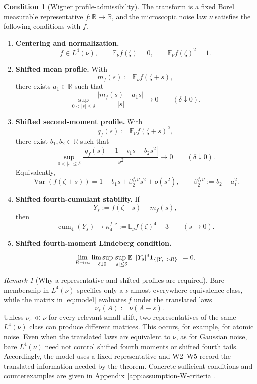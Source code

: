 \documentclass[11pt]{article}
\theoremstyle{definition}
\newtheorem{condition}[theorem]{Condition}
\theoremstyle{remark}
\newtheorem{remark}[theorem]{Remark}
\newcommand{\E}{\mathbb E}
\newcommand{\Var}{\operatorname{Var}}
\newcommand{\cum}{\operatorname{cum}}
\begin{document}
\begin{condition}[Wigner profile-admissibility]\label{cond:profile-admissibility}
The transform is a fixed Borel measurable representative
$f:\mathbb R\to\mathbb R$, and the microscopic noise law $\nu$ satisfies the
following conditions with $f$.
\begin{enumerate}[label=(W\arabic*)]
\item \textbf{Centering and normalization.}
\[
        f\in L^4(\nu),\qquad
        \E_\nu f(\zeta)=0,\qquad
        \E_\nu f(\zeta)^2=1 .
\]
\item \textbf{Shifted mean profile.} With
\[
        m_f(s):=\E_\nu f(\zeta+s),
\]
there exists $a_1\in\mathbb R$ such that
\[
        \sup_{0<|s|\le\delta}
        \frac{|m_f(s)-a_1s|}{|s|}\longrightarrow0
        \qquad(\delta\downarrow0).
\]
\item \textbf{Shifted second-moment profile.} With
\[
        q_f(s):=\E_\nu f(\zeta+s)^2,
\]
there exist $b_1,b_2\in\mathbb R$ such that
\[
        \sup_{0<|s|\le\delta}
        \frac{|q_f(s)-1-b_1s-b_2s^2|}{s^2}\longrightarrow0
        \qquad(\delta\downarrow0).
\]
Equivalently,
\[
        \Var(f(\zeta+s))
        =1+b_1s+\beta_2^{f,\nu}s^2+o(s^2),\qquad
        \beta_2^{f,\nu}:=b_2-a_1^2.
\]
\item \textbf{Shifted fourth-cumulant stability.} If
\[
        Y_s:=f(\zeta+s)-m_f(s),
\]
then
\[
        \cum_4(Y_s)\longrightarrow
        \kappa_4^{f,\nu}:=\E_\nu f(\zeta)^4-3
        \qquad(s\to0).
\]
\item \textbf{Shifted fourth-moment Lindeberg condition.}
\[
        \lim_{R\to\infty}\limsup_{\delta\downarrow0}
        \sup_{|s|\le\delta}
        \E\Bigl[|Y_s|^4{\bf 1}_{\{|Y_s|>R\}}\Bigr]=0.
\]
\end{enumerate}
\end{condition}

\begin{remark}[Why a representative and shifted profiles are required]
Bare membership in $L^4(\nu)$ specifies only a $\nu$-almost-everywhere
equivalence class, while the matrix in \eqref{eq:model} evaluates $f$ under
the translated laws
\[
 \nu_s(A):=\nu(A-s).
\]
Unless $\nu_s\ll\nu$ for every relevant small shift, two representatives of
the same $L^4(\nu)$ class can produce different matrices.  This occurs, for
example, for atomic noise.  Even when the translated laws are equivalent to
$\nu$, as for Gaussian noise, bare $L^4(\nu)$ need not control shifted fourth
moments or shifted fourth tails.  Accordingly, the model uses a fixed
representative and W2--W5 record the translated information needed by the
theorem.  Concrete sufficient conditions and counterexamples are given in
Appendix~\ref{app:assumption-W-criteria}.
\end{remark}
\end{document}
